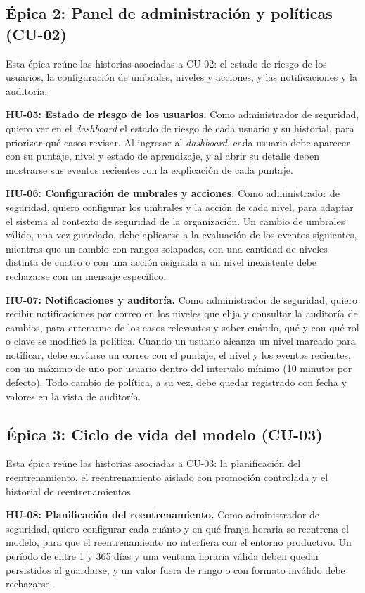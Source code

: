 \subsection{Épica 2: Panel de administración y políticas (CU-02)}

Esta épica reúne las historias asociadas a CU-02: el estado de riesgo de los usuarios, la configuración de umbrales, niveles y acciones, y las notificaciones y la auditoría.

\textbf{HU-05: Estado de riesgo de los usuarios.} Como administrador de seguridad, quiero ver en el \emph{dashboard} el estado de riesgo de cada usuario y su historial, para priorizar qué casos revisar. Al ingresar al \emph{dashboard}, cada usuario debe aparecer con su puntaje, nivel y estado de aprendizaje, y al abrir su detalle deben mostrarse sus eventos recientes con la explicación de cada puntaje.

\textbf{HU-06: Configuración de umbrales y acciones.} Como administrador de seguridad, quiero configurar los umbrales y la acción de cada nivel, para adaptar el sistema al contexto de seguridad de la organización. Un cambio de umbrales válido, una vez guardado, debe aplicarse a la evaluación de los eventos siguientes, mientras que un cambio con rangos solapados, con una cantidad de niveles distinta de cuatro o con una acción asignada a un nivel inexistente debe rechazarse con un mensaje específico.

\textbf{HU-07: Notificaciones y auditoría.} Como administrador de seguridad, quiero recibir notificaciones por correo en los niveles que elija y consultar la auditoría de cambios, para enterarme de los casos relevantes y saber cuándo, qué y con qué rol o clave se modificó la política. Cuando un usuario alcanza un nivel marcado para notificar, debe enviarse un correo con el puntaje, el nivel y los eventos recientes, con un máximo de uno por usuario dentro del intervalo mínimo (10 minutos por defecto). Todo cambio de política, a su vez, debe quedar registrado con fecha y valores en la vista de auditoría.

\subsection{Épica 3: Ciclo de vida del modelo (CU-03)}

Esta épica reúne las historias asociadas a CU-03: la planificación del reentrenamiento, el reentrenamiento aislado con promoción controlada y el historial de reentrenamientos.

\textbf{HU-08: Planificación del reentrenamiento.} Como administrador de seguridad, quiero configurar cada cuánto y en qué franja horaria se reentrena el modelo, para que el reentrenamiento no interfiera con el entorno productivo. Un período de entre 1 y 365 días y una ventana horaria válida deben quedar persistidos al guardarse, y un valor fuera de rango o con formato inválido debe rechazarse.

